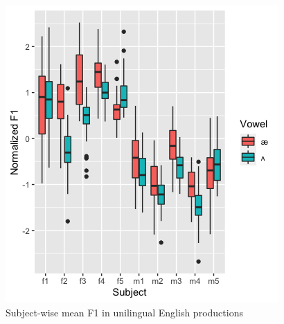 \documentclass[12 pt]{article}
\begin{document}
\begin{figure}[h] %
	
	\includegraphics[scale=1]{vowel_by_subject_ggplot}
	\caption{Subject-wise mean F1 in unilingual English productions}
	\label{boxplot_F1}
\end{figure}

\newpage
\end{document}
